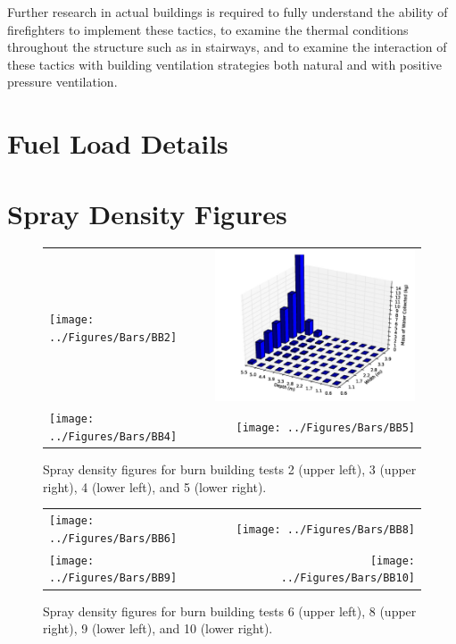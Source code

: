 \documentclass[12pt,oneside]{book}
\begin{document}
Further research in actual buildings is required to fully understand the ability of firefighters to implement these tactics, to examine the thermal conditions throughout the structure such as in stairways, and to examine the interaction of these tactics with building ventilation strategies both natural and with positive pressure ventilation.



\appendix

\chapter{Fuel Load Details}
\label{app:fuel_loads}


\chapter{Spray Density Figures}
\label{app:spray_density}

\begin{figure}[ht]
\begin{tabular*}{\textwidth}{lr}
\texttt{[image: ../Figures/Bars/BB2]} &
\includegraphics[width=3.2in]{../Figures/Bars/BB3} \\
\texttt{[image: ../Figures/Bars/BB4]} &
\texttt{[image: ../Figures/Bars/BB5]}
\end{tabular*}
\caption{Spray density figures for burn building tests 2 (upper left), 3 (upper right), 4 (lower left), and 5 (lower right).}
\label{fig:bb_2_5}
\end{figure}

\clearpage

\begin{figure}[ht]
\begin{tabular*}{\textwidth}{lr}
\texttt{[image: ../Figures/Bars/BB6]} &
\texttt{[image: ../Figures/Bars/BB8]} \\
\texttt{[image: ../Figures/Bars/BB9]} &
\texttt{[image: ../Figures/Bars/BB10]}
\end{tabular*}
\caption{Spray density figures for burn building tests 6 (upper left), 8 (upper right), 9 (lower left), and 10 (lower right).}
\label{fig:bb_6_10}
\end{figure}
\end{document}
